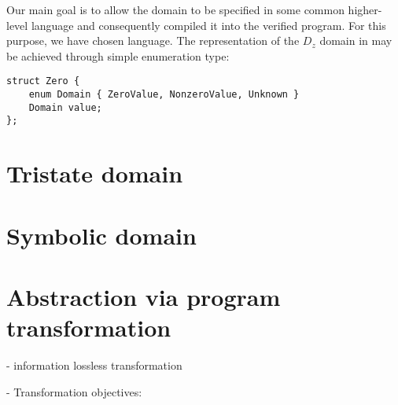 Our main goal is to allow the domain to be specified in some common higher-level
language and consequently compiled it into the verified program. For this purpose,
we have chosen \Cpp{} language. The representation of the $D_z$ domain in
\Cpp{} may be achieved through simple enumeration type:
\begin{verbatim}
struct Zero {
    enum Domain { ZeroValue, NonzeroValue, Unknown }
    Domain value;
};
\end{verbatim}



\section{Tristate domain}


\section{Symbolic domain}


\section{Abstraction via program transformation}

- information lossless transformation

- Transformation objectives:

